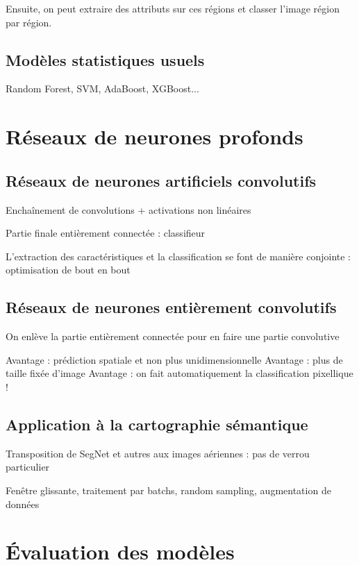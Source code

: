 Ensuite, on peut extraire des attributs sur ces régions et classer l'image région par région.

\subsection{Modèles statistiques usuels}

Random Forest, SVM, AdaBoost, XGBoost...

\section{Réseaux de neurones profonds}

\subsection{Réseaux de neurones artificiels convolutifs}

Enchaînement de convolutions + activations non linéaires

Partie finale entièrement connectée : classifieur

L'extraction des caractéristiques et la classification se font de manière conjointe : optimisation de bout en bout

\subsection{Réseaux de neurones entièrement convolutifs}

On enlève la partie entièrement connectée pour en faire une partie convolutive

Avantage : prédiction spatiale et non plus unidimensionnelle
Avantage : plus de taille fixée d'image
Avantage : on fait automatiquement la classification pixellique !

\subsection{Application à la cartographie sémantique}

Transposition de SegNet et autres aux images aériennes : pas de verrou particulier

Fenêtre glissante, traitement par batchs, random sampling, augmentation de données

\section{Évaluation des modèles}

